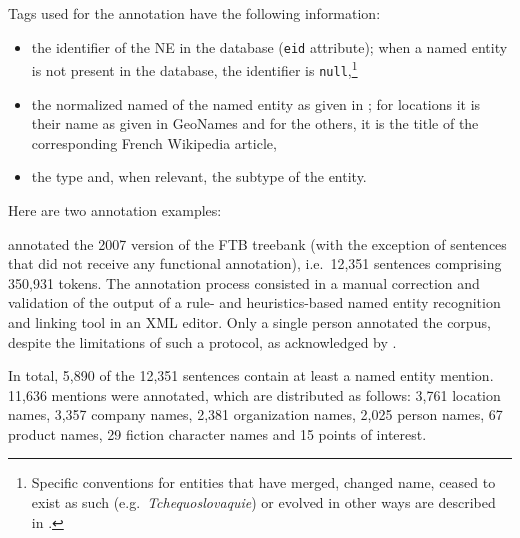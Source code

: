 Tags used for the annotation have the following information:
\begin{itemize}
    \item the identifier of the NE in the \aleda database (\texttt{eid} attribute); when a named entity is not present in the database, the identifier is \texttt{null},\footnote{Specific conventions for entities that have merged, changed name, ceased to exist as such (e.g.~\emph{Tchequoslovaquie}) or evolved in other ways are described in .}
    \item the normalized named of the named entity as given in \aleda; for locations it is their name as given in GeoNames and for the others, it is the title of the corresponding French Wikipedia article,
    \item the type and, when relevant, the subtype of the entity.
\end{itemize}
Here are two annotation examples:\\

 annotated the 2007 version of the FTB treebank (with the exception of sentences that did not receive any functional annotation), i.e.~12,351 sentences comprising 350,931 tokens. The annotation process consisted in a manual correction and validation of the output of a rule- and heuristics-based named entity recognition and linking tool in an XML editor.
Only a single person annotated the corpus, despite the limitations of such a protocol, as acknowledged by .

In total, 5,890 of the 12,351 sentences contain at least a named entity mention. 11,636 mentions were annotated, which are distributed as follows:
3,761 location names, 3,357 company names, 2,381 organization names, 2,025 person names, 67 product names, 29 fiction character names and 15 points of interest.

